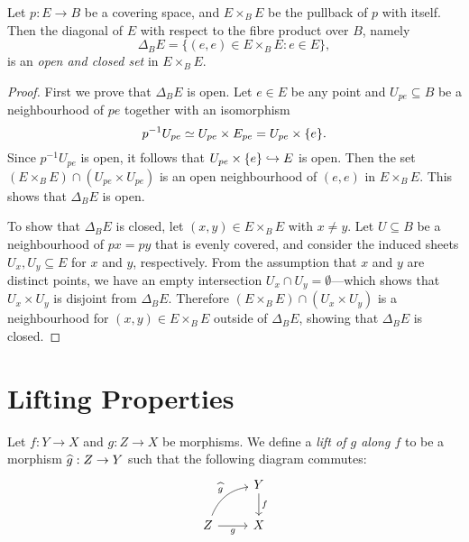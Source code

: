 \begin{lemma}
    \label{lem:fibre-wise-diag-open-and-closed}
    Let \(p: E \to B\) be a covering space, and \(E \times_B E\) be the pullback of
    \(p\) with itself. Then the diagonal of \(E\) with respect to the fibre product
    over \(B\), namely
    \[
        \Delta_B E = \{(e, e) \in E \times_B E \colon e \in E\},
    \]
    is an \emph{open and closed set} in \(E \times_B E\).
\end{lemma}

\begin{proof}
    First we prove that \(\Delta_B E\) is open. Let \(e \in E\) be any point and
    \(U_{p e} \subseteq B\) be a neighbourhood of \(p e\) together with an
    isomorphism
    \[
        p^{-1} U_{p e} \simeq U_{p e} \times E_{p e} = U_{p e} \times \{e\}.
    \]
    Since \(p^{-1} U_{p e}\) is open, it follows that
    \(U_{p e} \times \{e\} \hookrightarrow E\) is open. Then the set
    \((E \times_B E) \cap (U_{p e} \times U_{p e})\) is an open neighbourhood of
    \((e, e)\) in \(E \times_B E\). This shows that \(\Delta_B E\) is open.

    To show that \(\Delta_B E\) is closed, let \((x, y) \in E \times_B E\) with
    \(x \neq y\). Let \(U \subseteq B\) be a neighbourhood of \(p x = p y\) that is
    evenly covered, and consider the induced sheets \(U_x, U_y \subseteq E\) for
    \(x\) and \(y\), respectively. From the assumption that \(x\) and \(y\) are
    distinct points, we have an empty intersection
    \(U_x \cap U_y = \emptyset\)---which shows that \(U_x \times U_y\) is disjoint
    from \(\Delta_B E\). Therefore \((E \times_B E) \cap (U_x \times U_y)\) is a
    neighbourhood for \((x, y) \in E \times_B E\) outside of \(\Delta_B E\), showing
    that \(\Delta_B E\) is closed.
\end{proof}

\section{Lifting Properties}

\begin{definition}[Lift]
    \label{def:lift-top}
    Let \(f: Y \to X\) and \(g: Z \to X\) be morphisms. We define a \emph{lift of
        \(g\) along \(f\)} to be a morphism \(\widehat{g}: Z \to Y\) such that the
    following diagram commutes:
    \[
        \begin{tikzcd}
            &Y \ar[d, "f"] \\
            Z \ar[r, "g"'] \ar[ru, "\lift g", bend left] & X
        \end{tikzcd}
    \]
\end{definition}

